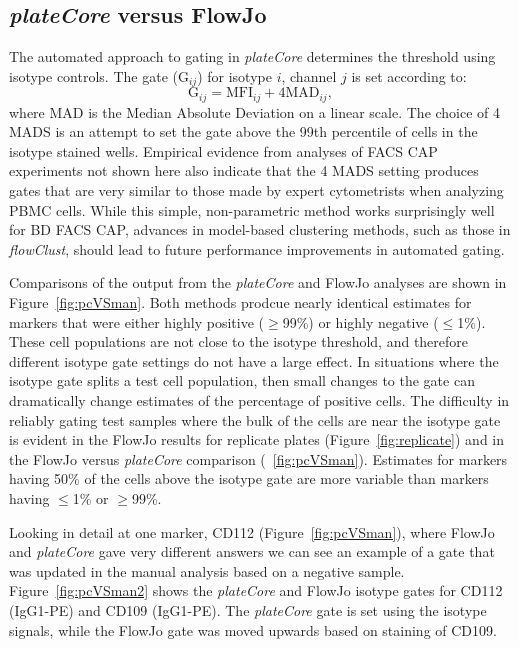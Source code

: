 \documentclass[12pt]{article}
\newcommand{\Rpackage}[1]{{\textit{#1}}}
\begin{document}
\subsection*{\Rpackage{plateCore} versus FlowJo}
The automated approach to gating in \Rpackage{plateCore} determines the
threshold using isotype controls. The gate (G$_{ij}$) for isotype $i$, channel
$j$ is set according to:
\begin{equation}
\text{G}_{ij} = \text{MFI}_{ij} + 4 \text{MAD}_{ij},
\label{isoGate}
\end{equation}
where MAD is the Median Absolute Deviation on a linear scale. The choice of 4
MADS is an attempt to set the gate above the 99th percentile of cells in the
isotype stained wells. Empirical evidence from analyses of FACS CAP experiments
not shown here also indicate that the 4 MADS setting produces gates that are
very similar to those made by expert cytometrists when analyzing PBMC cells.
While this simple, non-parametric method works surprisingly well for BD FACS
CAP, advances in model-based clustering methods, such as those in
\Rpackage{flowClust}, should lead to future performance improvements in
automated gating. 

Comparisons of the output from the \Rpackage{plateCore} and FlowJo analyses are
shown in Figure~\ref{fig:pcVSman}. Both methods prodcue nearly identical
estimates for markers that were either highly positive ($\ge$99\%) or highly
negative ($\le$1\%). These cell populations are not close to the isotype
threshold, and therefore different isotype gate settings do not have a large
effect. In situations where the isotype gate splits a test cell population, then
small changes to the gate can dramatically change estimates of the percentage
of positive cells. The difficulty in reliably gating test samples where the
bulk of the cells are near the isotype gate is evident in the FlowJo results
for replicate plates (Figure~\ref{fig:replicate}) and in the FlowJo versus
\Rpackage{plateCore} comparison (~\ref{fig:pcVSman}). Estimates for markers
having 50\% of the cells above the isotype gate are more variable than markers
having $\le$1\% or $\ge$99\%.

Looking in detail at one marker, CD112 (Figure~\ref{fig:pcVSman}), where FlowJo
and \Rpackage{plateCore} gave very different answers we can see an example of a
gate that was updated in the manual analysis based on a negative sample.
Figure~\ref{fig:pcVSman2} shows the \Rpackage{plateCore} and FlowJo isotype
gates for CD112 (IgG1-PE) and CD109 (IgG1-PE). The \Rpackage{plateCore} gate is
set using the isotype signals, while the FlowJo gate was moved upwards based
on staining of CD109. 
\end{document}
